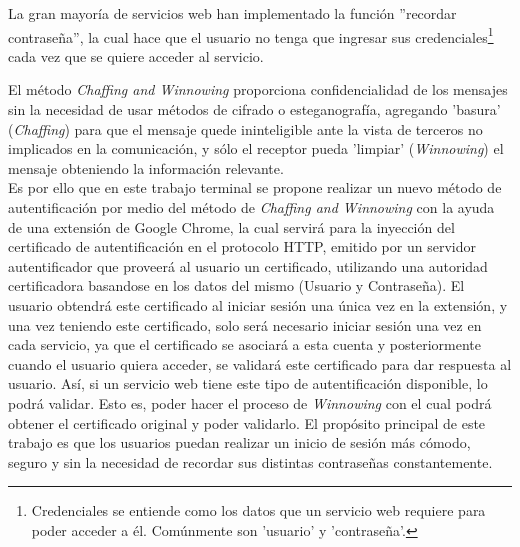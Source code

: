 \documentclass[12pt, a4paper, titlepage]{report}
\begin{document}
		La gran mayoría de servicios web han implementado la función ''recordar contraseña'', la cual hace que el usuario no tenga que ingresar sus credenciales\footnote{Credenciales se entiende como los datos que un servicio web requiere para poder acceder a él. Comúnmente son 'usuario' y 'contraseña'.} cada vez que se quiere acceder al servicio.  
		

	    
	    El método \textit{Chaffing and Winnowing} proporciona confidencialidad de los mensajes sin la necesidad de usar métodos de cifrado o esteganografía\cite{refRivestSeguridad}, agregando 'basura' (\textit{Chaffing}) para que el mensaje quede ininteligible ante la vista de terceros no implicados en la comunicación, y sólo el receptor pueda 'limpiar' (\textit{Winnowing}) el mensaje obteniendo la información relevante.\\
	    
		Es por ello que en este trabajo terminal se propone realizar un nuevo método de autentificación por medio del método de \textit{Chaffing and Winnowing} con la ayuda de una extensión de Google Chrome, la cual servirá para la inyección del certificado de autentificación en el protocolo HTTP, emitido por un servidor autentificador que proveerá al usuario un certificado, utilizando una autoridad certificadora basandose en los datos del mismo (Usuario y Contraseña). El usuario obtendrá este certificado al iniciar sesión una única vez en la extensión, y una vez teniendo este certificado, solo será necesario iniciar sesión una  vez en cada servicio, ya que el certificado se asociará a esta cuenta y posteriormente cuando el usuario quiera acceder, se validará este certificado para dar respuesta al usuario. Así, si un servicio web tiene este tipo de autentificación disponible, lo podrá validar. Esto es, poder hacer el proceso de \textit{Winnowing} con el cual podrá obtener el certificado original y poder validarlo. El propósito principal de este trabajo es que los usuarios puedan realizar un inicio de sesión más cómodo, seguro y sin la necesidad de recordar sus distintas contraseñas constantemente.
		
\end{document}
